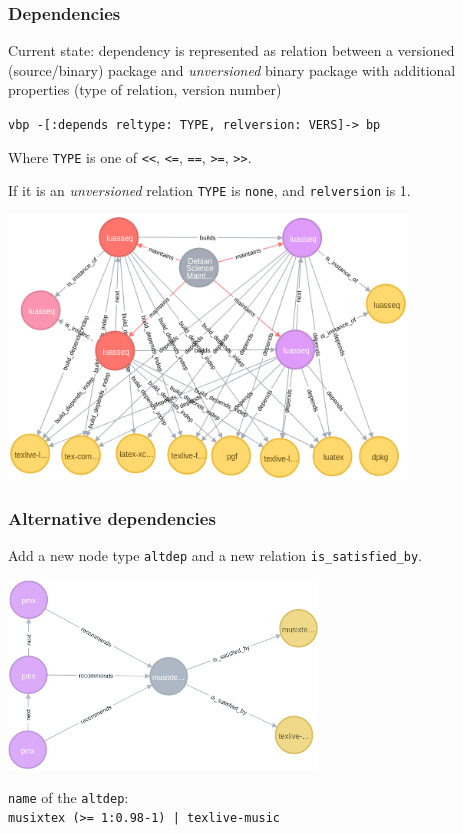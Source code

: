 \documentclass[hyperref]{beamer}
\begin{document}
\begin{frame}
  \frametitle{Dependencies}
  Current state: dependency is represented as relation between a
  versioned (source/binary) package and \emph{unversioned} binary
  package with additional properties (type of relation, version
  number)

  \begin{center}
    \texttt{vbp -[:depends {reltype: TYPE, relversion: VERS}]-> bp}
  \end{center}
  Where \texttt{TYPE} is one of \texttt{<<}, \texttt{<=}, \texttt{==},
  \texttt{>=}, \texttt{>>}.

  If it is an \emph{unversioned} relation \texttt{TYPE} is
  \texttt{none}, and \texttt{relversion} is 1.
\end{frame}

\begin{frame}
  \begin{center}
    \includegraphics[height=7cm]{add-depends.png}
  \end{center}
\end{frame}

\begin{frame}
  \frametitle{Alternative dependencies}
  Add a new node type \texttt{altdep} and a new relation
  \texttt{is\_satisfied\_by}.
  \begin{center}
    \includegraphics[height=5cm]{altdeps.png}
  \end{center}
  \texttt{name} of the \texttt{altdep}:\\
  \texttt{musixtex (>= 1:0.98-1) | texlive-music}
\end{frame}
\end{document}
